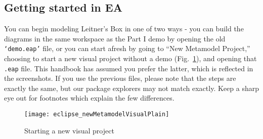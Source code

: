 \subsection{Getting started in EA}
\visHeader
\hypertarget{static:starting vis}{}

You can begin modeling Leitner's Box in one of two ways - you can build the diagrams in the same workspace as the Part I demo by
opening the old \texttt{`demo.eap'} file, or you can start afresh by going to ``New Metamodel Project,'' choosing to start a new visual project without a demo
(Fig.~\ref{fig:new_visModel}), and opening that \texttt{.eap} file. This handbook has assumed you prefer the latter, which is reflected in the screenshots.
If you use the previous files, please note that the steps are exactly the same, but our package explorers may not match exactly. Keep a sharp eye out for
footnotes which explain the few differences.

\begin{figure}[htbp]
	\centering
  \texttt{[image: eclipse\_newMetamodelVisualPlain]}
	\caption{Starting a new visual project}
	\label{fig:new_visModel}
\end{figure}

